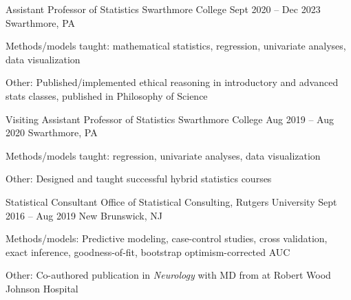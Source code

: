 \documentclass[letterpaper]{resume_config}
\begin{document}
\WorkExperience
    {Assistant Professor of Statistics}  
    {Swarthmore College}  
    {Sept 2020 -- Dec 2023}  
    {Swarthmore, PA}  
    {
        \item Methods/models taught: mathematical statistics, regression, univariate analyses, data visualization         
        \item Other: Published/implemented ethical reasoning in introductory and advanced stats classes, published in Philosophy of Science         
    } 



\WorkExperience
    {Visiting Assistant Professor of Statistics}  
    {Swarthmore College}  
    {Aug 2019 -- Aug 2020}  
    {Swarthmore, PA}  
    {
        \item Methods/models taught: regression, univariate analyses, data visualization  
        \item Other: Designed and taught successful hybrid statistics courses 
        } 


\WorkExperience
    {Statistical Consultant}  
    {Office of Statistical Consulting, Rutgers University} 
    {Sept 2016 -- Aug 2019} 
    {New Brunswick, NJ}  
    {
        \item Methods/models: Predictive modeling, case-control studies, cross validation, exact inference, goodness-of-fit, bootstrap optimism-corrected AUC  
        \item Other: Co-authored publication in {\it Neurology} with MD from at Robert Wood Johnson Hospital
    } 


\end{document}
